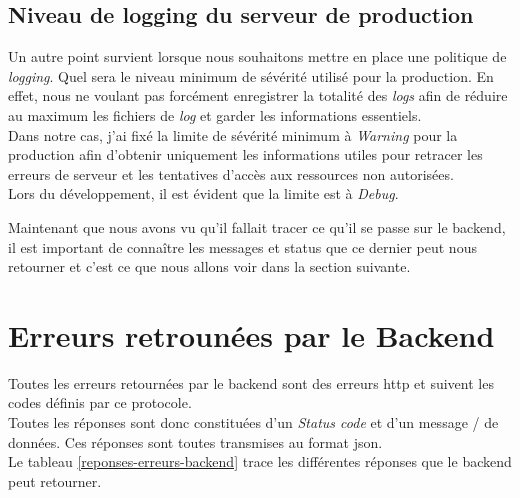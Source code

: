 \documentclass[
    iai, %
    il, %
]{heig-tb}
\begin{document}
\subsection{Niveau de logging du serveur de production}
Un autre point survient lorsque nous souhaitons mettre en place une politique de \emph{logging}. Quel sera le niveau minimum de sévérité utilisé pour la production. En effet, nous ne voulant pas forcément enregistrer la totalité des \emph{logs} afin de réduire au maximum les fichiers de \emph{log} et garder les informations essentiels. \\
Dans notre cas, j'ai fixé la limite de sévérité minimum à \emph{Warning} pour la production afin d'obtenir uniquement les informations utiles pour retracer les erreurs de serveur et les tentatives d'accès aux ressources non autorisées. \\
Lors du développement, il est évident que la limite est à \emph{Debug}.

Maintenant que nous avons vu qu'il fallait tracer ce qu'il se passe sur le \Gls{backend}, il est important de connaître les messages et status que ce dernier peut nous retourner et c'est ce que nous allons voir dans la section suivante.

\section{Erreurs retrounées par le Backend}
Toutes les erreurs retournées par le \Gls{backend} sont des erreurs \Gls{http} et suivent les codes définis par ce protocole. \\
Toutes les réponses sont donc constituées d'un \emph{Status code} et d'un message / de données. Ces réponses sont toutes transmises au format \Gls{json}. \\
Le tableau \ref{reponses-erreurs-backend} trace les différentes réponses que le \Gls{backend} peut retourner.
\end{document}
